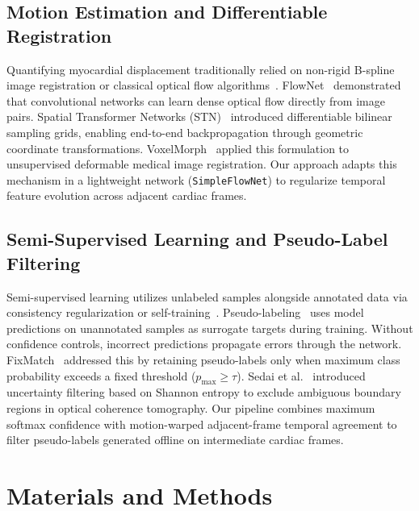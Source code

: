 \documentclass[pdflatex,sn-mathphys]{sn-jnl}
\theoremstyle{thmstyleone}
\theoremstyle{thmstyletwo}
\theoremstyle{thmstylethree}
\begin{document}
\subsection{Motion Estimation and Differentiable Registration}
Quantifying myocardial displacement traditionally relied on non-rigid B-spline image registration or classical optical flow algorithms~\cite{zheng2019motion}. FlowNet~\cite{dosovitskiy2015flownet} demonstrated that convolutional networks can learn dense optical flow directly from image pairs. Spatial Transformer Networks (STN)~\cite{jaderberg2015spatial} introduced differentiable bilinear sampling grids, enabling end-to-end backpropagation through geometric coordinate transformations. VoxelMorph~\cite{balakrishnan2019voxelmorph} applied this formulation to unsupervised deformable medical image registration. Our approach adapts this mechanism in a lightweight network (\texttt{SimpleFlowNet}) to regularize temporal feature evolution across adjacent cardiac frames.

\subsection{Semi-Supervised Learning and Pseudo-Label Filtering}
Semi-supervised learning utilizes unlabeled samples alongside annotated data via consistency regularization or self-training~\cite{tarvainen2017mean}. Pseudo-labeling~\cite{lee2013pseudo} uses model predictions on unannotated samples as surrogate targets during training. Without confidence controls, incorrect predictions propagate errors through the network. FixMatch~\cite{sohn2020fixmatch} addressed this by retaining pseudo-labels only when maximum class probability exceeds a fixed threshold ($p_{\max} \ge \tau$). Sedai et al.~\cite{sedai2019uncertainty} introduced uncertainty filtering based on Shannon entropy to exclude ambiguous boundary regions in optical coherence tomography. Our pipeline combines maximum softmax confidence with motion-warped adjacent-frame temporal agreement to filter pseudo-labels generated offline on intermediate cardiac frames.

\section{Materials and Methods}\label{sec:methods}
\end{document}
